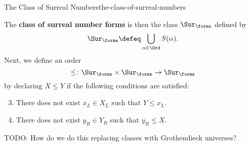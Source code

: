 \begin{construction}{The Class of Surreal Numbers}{the-class-of-surreal-numbers}
\begin{enumerate}
    \end{enumerate}
    The \textbf{class of surreal number forms} is then the class $\Sur_{\forms}$ defined by
    \[
        \Sur_{\forms}%
        \defeq%
        \bigcup_{\alpha\in\Ord}S(\alpha).%
    \]%
    Next, we define an order
    \[
        \leq%
        \colon%
        \Sur_{\forms}%
        \times%
        \Sur_{\forms}%
        \to%
        \Sur_{\forms}%
    \]%
    by declaring $X\leq Y$ if the following conditions are satisfied:
    \begin{enumerate}\setcounter{enumi}{2}
        \item\label{the-class-of-surreal-numbers-ordering-1}There does not exist $x_{L}\in X_{L}$ such that $Y\leq x_{L}$.
        \item\label{the-class-of-surreal-numbers-ordering-2}There does not exist $y_{R}\in Y_{R}$ such that $y_{R}\leq X$.
    \end{enumerate}
\end{construction}
TODO: How do we do this replacing classes with Grothendieck universes?
